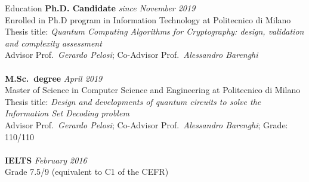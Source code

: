 \documentclass{resume} %
\newif\ifpublic{}
\begin{document}
\ifpublic{%
    \begin{mytabular}
      \row{Academic email}{simone.perriello@polimi.it}
    \end{mytabular}%
  }
\else{%
    \begin{mytabular}
    \end{mytabular}%
  }
\fi

\begin{rSection}{Education}
\textbf{Ph.D. Candidate} \hfill \textit{since November 2019}
\\ Enrolled in Ph.D program in Information Technology at Politecnico di Milano 
\\ Thesis title: \textit{Quantum Computing Algorithms for Cryptography: design, validation and complexity assessment}
\\ Advisor Prof.\ \textit{Gerardo Pelosi}; Co-Advisor Prof.\ \textit{Alessandro Barenghi}
\\
\\
\textbf{M.Sc.\ degree} \hfill \textit{April 2019} 
\\ Master of Science in Computer Science and Engineering at Politecnico di Milano
\\ Thesis title: \textit{Design and developments of quantum circuits to solve the Information Set Decoding problem}
\\ Advisor Prof.\ \textit{Gerardo Pelosi}; Co-Advisor Prof.\ \textit{Alessandro Barenghi}; Grade: 110/110
\\
\\
\textbf{IELTS} \hfill \textit{February 2016}
\\ Grade 7.5/9 (equivalent to C1 of the CEFR)
\\
\end{rSection}
\end{document}
